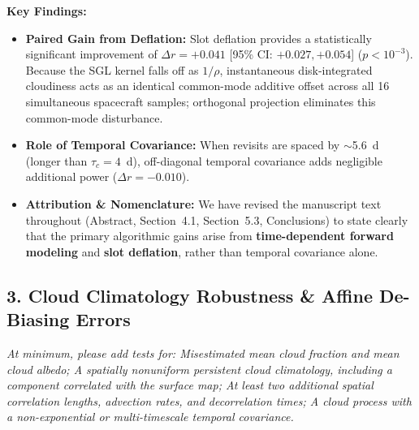 \documentclass[11pt]{article}
\begin{document}
\textbf{Key Findings:}
\begin{itemize}
\item \textbf{Paired Gain from Deflation:} Slot deflation provides a statistically significant improvement of $\Delta r = +0.041$ [95\% CI: $+0.027, +0.054$] ($p < 10^{-3}$). Because the SGL kernel falls off as $1/\rho$, instantaneous disk-integrated cloudiness acts as an identical common-mode additive offset across all 16 simultaneous spacecraft samples; orthogonal projection eliminates this common-mode disturbance.
\item \textbf{Role of Temporal Covariance:} When revisits are spaced by $\sim$5.6~d (longer than $\tau_c=4$~d), off-diagonal temporal covariance adds negligible additional power ($\Delta r = -0.010$).
\item \textbf{Attribution \& Nomenclature:} We have revised the manuscript text throughout (Abstract, Section~4.1, Section~5.3, Conclusions) to state clearly that the primary algorithmic gains arise from \textbf{time-dependent forward modeling} and \textbf{slot deflation}, rather than temporal covariance alone.
\end{itemize}

\subsection*{3. Cloud Climatology Robustness \& Affine De-Biasing Errors}

\begin{refcomment}
\textit{At minimum, please add tests for: Misestimated mean cloud fraction and mean cloud albedo; A spatially nonuniform persistent cloud climatology, including a component correlated with the surface map; At least two additional spatial correlation lengths, advection rates, and decorrelation times; A cloud process with a non-exponential or multi-timescale temporal covariance.}
\end{refcomment}
\end{document}
